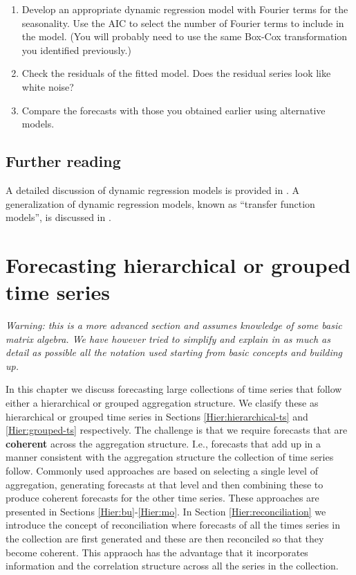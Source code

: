 \documentclass[]{book}
\providecommand{\tightlist}{%
  \setlength{\itemsep}{0pt}\setlength{\parskip}{0pt}}
\begin{document}
\begin{enumerate}
  \begin{enumerate}
  \def\labelenumii{\alph{enumii}.}
  \tightlist
  \item
    Develop an appropriate dynamic regression model with Fourier terms for the seasonality. Use the AIC to select the number of Fourier terms to include in the model. (You will probably need to use the same Box-Cox transformation you identified previously.)
  \item
    Check the residuals of the fitted model. Does the residual series look like white noise?
  \item
    Compare the forecasts with those you obtained earlier using alternative models.
  \end{enumerate}
\end{enumerate}

\hypertarget{further-reading-6}{%
\section{Further reading}\label{further-reading-6}}

A detailed discussion of dynamic regression models is provided in \citet{Pankratz91}. A generalization of dynamic regression models, known as ``transfer function models'', is discussed in \citet{BJRL15}.

\hypertarget{ch-hierarchical}{%
\chapter{Forecasting hierarchical or grouped time series}\label{ch-hierarchical}}

\emph{Warning: this is a more advanced section and assumes knowledge of some basic matrix algebra. We have however tried to simplify and explain in as much as detail as possible all the notation used starting from basic concepts and building up.}

In this chapter we discuss forecasting large collections of time series that follow either a hierarchical or grouped aggregation structure. We clasify these as hierarchical or grouped time series in Sections \ref{Hier:hierarchical-ts} and \ref{Hier:grouped-ts} respectively. The challenge is that we require forecasts that are \textbf{coherent} across the aggregation structure. I.e., forecasts that add up in a manner consistent with the aggregation structure the collection of time series follow. Commonly used approaches are based on selecting a single level of aggregation, generating forecasts at that level and then combining these to produce coherent forecasts for the other time series. These approaches are presented in Sections \ref{Hier:bu}-\ref{Hier:mo}. In Section \ref{Hier:reconciliation} we introduce the concept of reconciliation where forecasts of all the times series in the collection are first generated and these are then reconciled so that they become coherent. This appraoch has the advantage that it incorporates information and the correlation structure across all the series in the collection.
\end{document}
